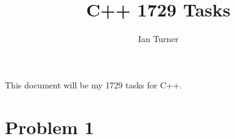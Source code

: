\documentclass{article}
\title{C++ 1729 Tasks}
\author{Ian Turner}
\begin{document}
\maketitle
This document will be my 1729 tasks for C++.

\section*{Problem 1}
\end{document}
